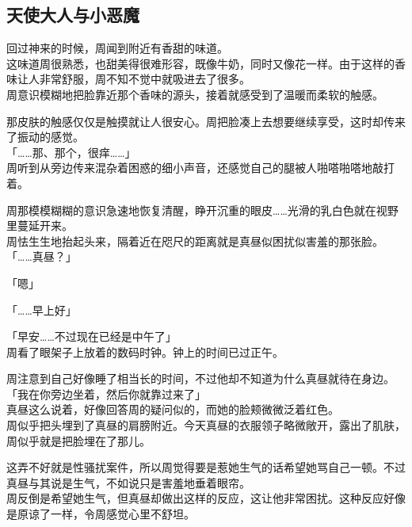 \subsection{天使大人与小恶魔}

回过神来的时候，周闻到附近有香甜的味道。\\

这味道周很熟悉，也甜美得很难形容，既像牛奶，同时又像花一样。由于这样的香味让人非常舒服，周不知不觉中就吸进去了很多。\\

周意识模糊地把脸靠近那个香味的源头，接着就感受到了温暖而柔软的触感。

那皮肤的触感仅仅是触摸就让人很安心。周把脸凑上去想要继续享受，这时却传来了振动的感觉。\\

「……那、那个，很痒……」\\

周听到从旁边传来混杂着困惑的细小声音，还感觉自己的腿被人啪嗒啪嗒地敲打着。

周那模模糊糊的意识急速地恢复清醒，睁开沉重的眼皮……光滑的乳白色就在视野里蔓延开来。\\

周怯生生地抬起头来，隔着近在咫尺的距离就是真昼似困扰似害羞的那张脸。\\

「……真昼？」

「嗯」

「……早上好」

「早安……不过现在已经是中午了」\\

周看了眼架子上放着的数码时钟。钟上的时间已过正午。

周注意到自己好像睡了相当长的时间，不过他却不知道为什么真昼就待在身边。\\

「我在你旁边坐着，然后你就靠过来了」\\

真昼这么说着，好像回答周的疑问似的，而她的脸颊微微泛着红色。\\

周似乎把头埋到了真昼的肩膀附近。今天真昼的衣服领子略微敞开，露出了肌肤，周似乎就是把脸埋在了那儿。

这弄不好就是性骚扰案件，所以周觉得要是惹她生气的话希望她骂自己一顿。不过真昼与其说是生气，不如说只是害羞地垂着眼帘。\\

周反倒是希望她生气，但真昼却做出这样的反应，这让他非常困扰。这种反应好像是原谅了一样，令周感觉心里不舒坦。\\

